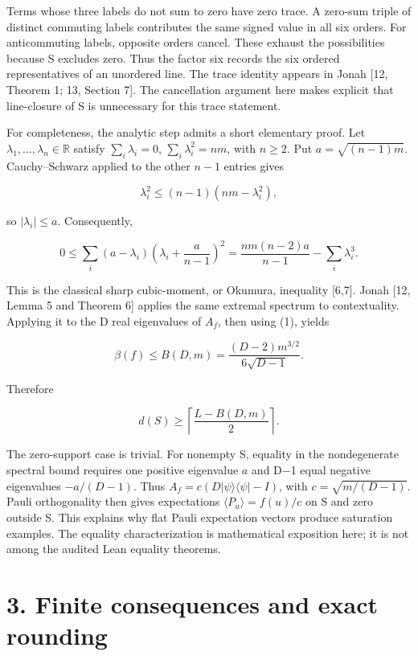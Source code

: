 \documentclass[11pt,letterpaper]{article}
\begin{document}
Terms whose three labels do not sum to zero have zero trace. A zero-sum triple of distinct commuting labels contributes the same signed value in all six orders. For anticommuting labels, opposite orders cancel. These exhaust the possibilities because S excludes zero. Thus the factor six records the six ordered representatives of an unordered line. The trace identity appears in Jonah {[}12, Theorem 1; 13, Section 7{]}. The cancellation argument here makes explicit that line-closure of S is unnecessary for this trace statement.

For completeness, the analytic step admits a short elementary proof. Let \(\lambda_1,\ldots,\lambda_n\in\mathbb R\) satisfy \(\sum_i\lambda_i=0\), \(\sum_i\lambda_i^2=nm\), with \(n\ge2\). Put \(a=\sqrt{(n-1)m}\). Cauchy--Schwarz applied to the other \(n-1\) entries gives

\[\lambda_i^2\le(n-1)(nm-\lambda_i^2),\]

so \(|\lambda_i|\le a\). Consequently,

\[0\le\sum_i(a-\lambda_i)
\left(\lambda_i+\frac{a}{n-1}\right)^2
=\frac{nm(n-2)a}{n-1}-\sum_i\lambda_i^3.
\tag{2}\]

This is the classical sharp cubic-moment, or Okumura, inequality {[}6,7{]}. Jonah {[}12, Lemma 5 and Theorem 6{]} applies the same extremal spectrum to contextuality. Applying it to the D real eigenvalues of \(A_f\), then using (1), yields

\[\boxed{\beta(f)\le B(D,m)
=\frac{(D-2)m^{3/2}}{6\sqrt{D-1}}.}
\tag{3}\]

Therefore

\[\boxed{d(S)\ge\left\lceil\frac{L-B(D,m)}2\right\rceil.}
\tag{4}\]

The zero-support case is trivial. For nonempty S, equality in the nondegenerate spectral bound requires one positive eigenvalue \(a\) and D−1 equal negative eigenvalues \(-a/(D-1)\). Thus \(A_f=c(D|\psi\rangle\langle\psi|-I)\), with \(c=\sqrt{m/(D-1)}\). Pauli orthogonality then gives expectations \(\langle P_u\rangle=f(u)/c\) on S and zero outside S. This explains why flat Pauli expectation vectors produce saturation examples. The equality characterization is mathematical exposition here; it is not among the audited Lean equality theorems.

\section{3. Finite consequences and exact rounding}\label{finite-consequences-and-exact-rounding}
\end{document}
